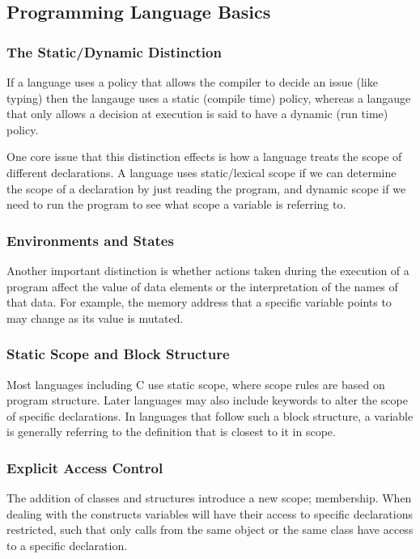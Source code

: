 \documentclass[titlepage]{article}
\begin{document}
\subsection{Programming Language Basics}

\subsubsection*{The Static/Dynamic Distinction}
If a language uses a policy that allows the compiler to decide an issue (like typing) then the langauge uses a static (compile time) policy, whereas a langauge that only allows a decision at execution is said to have a dynamic (run time) policy.

One core issue that this distinction effects is how a language treats the scope of different declarations. A language uses static/lexical scope if we can determine the scope of a declaration by just reading the program, and dynamic scope if we need to run the program to see what scope a variable is referring to.

\subsubsection*{Environments and States}
Another important distinction is whether actions taken during the execution of a program affect the value of data elements or the interpretation of the names of that data. For example, the memory address that a specific variable points to may change as its value is mutated.

\subsubsection*{Static Scope and Block Structure}
Most languages including C use static scope, where scope rules are based on program structure. Later languages may also include keywords to alter the scope of specific declarations. In languages that follow such a block structure, a variable is generally referring to the definition that is closest to it in scope.

\subsubsection*{Explicit Access Control}
The addition of classes and structures introduce a new scope; membership. When dealing with the constructs variables will have their access to specific declarations restricted, such that only calls from the same object or the same class have access to a specific declaration.
\end{document}
